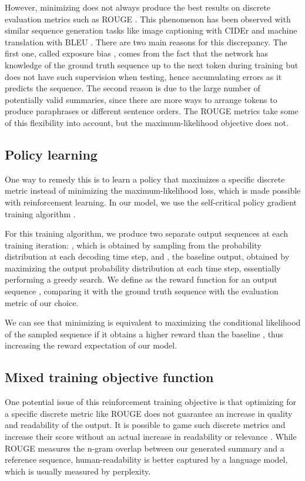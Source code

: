 \documentclass{article} \usepackage{iclr2018_arxiv,times}
\begin{document}
However, minimizing  does not always produce the best results on discrete evaluation metrics such as ROUGE \citep{lin2004}. This phenomenon has been observed with similar sequence generation tasks like image captioning with CIDEr \citep{rennie2016} and machine translation with BLEU \citep{wu2016,norouzi2016}. There are two main reasons for this discrepancy. The first one, called exposure bias \citep{ranzato2015}, comes from the fact that the network has knowledge of the ground truth sequence up to the next token during training but does not have such supervision when testing, hence accumulating errors as it predicts the sequence. The second reason is due to the large number of potentially valid summaries, since there are more ways to arrange tokens to produce paraphrases or different sentence orders. The ROUGE metrics take some of this flexibility into account, but the maximum-likelihood objective does not. 

\subsection{Policy learning}

One way to remedy this is to learn a policy that maximizes a specific discrete metric instead of minimizing the maximum-likelihood loss, which is made possible with reinforcement learning. In our model, we use the self-critical policy gradient training algorithm \citep{rennie2016}.

For this training algorithm, we produce two separate output sequences at each training iteration: , which is obtained by sampling from the  probability distribution at each decoding time step, and , the baseline output, obtained by maximizing the output probability distribution at each time step, essentially performing a greedy search. We define  as the reward function for an output sequence , comparing it with the ground truth sequence  with the evaluation metric of our choice.

We can see that minimizing  is equivalent to maximizing the conditional likelihood of the sampled sequence  if it obtains a higher reward than the baseline , thus increasing the reward expectation of our model.

\subsection{Mixed training objective function}

One potential issue of this reinforcement training objective is that optimizing for a specific discrete metric like ROUGE does not guarantee an increase in quality and readability of the output. It is possible to game such discrete metrics and increase their score without an actual increase in readability or relevance \citep{liu2016}. While ROUGE measures the n-gram overlap between our generated summary and a reference sequence, human-readability is better captured by a language model, which is usually measured by perplexity.
\end{document}
